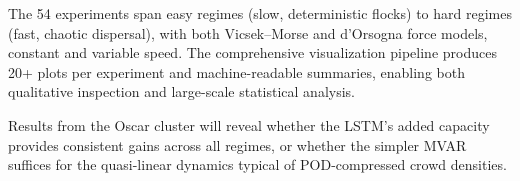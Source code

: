\documentclass[11pt]{article}
\begin{document}
The 54 experiments span easy regimes (slow, deterministic flocks) to
hard regimes (fast, chaotic dispersal), with both Vicsek--Morse and
d'Orsogna force models, constant and variable speed.  The comprehensive
visualization pipeline produces 20+ plots per experiment and
machine-readable summaries, enabling both qualitative inspection and
large-scale statistical analysis.

Results from the Oscar cluster will reveal whether the LSTM's added
capacity provides consistent gains across all regimes, or whether the
simpler MVAR suffices for the quasi-linear dynamics typical of
POD-compressed crowd densities.
\end{document}
